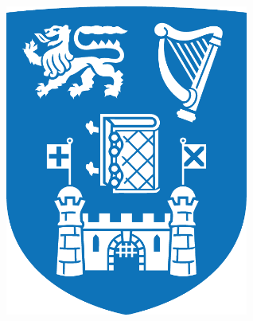 
\begin{titlepage}

\begin{addmargin}[1cm]{-1cm}
\begin{center}
\large

\hfill
\vfill

\begingroup
\color{black}\spacedallcaps{\textbf{\myTitle}} \\ \bigskip %
\endgroup



\vfill
\medskip

\includegraphics[width=8cm]{Images/trinity_newb.pdf} \\ \medskip %


\medskip
\medskip
\medskip
{\myProf}\\%
\medskip
\medskip
\small{}\\
\small{}\\
\medskip
\medskip
\small\spacedallcaps{ \myFaculty }\\
\small\spacedallcaps{ \myUni     }\\
\medskip
\medskip
\small{}


\vfill

\end{center}
\end{addmargin}

\end{titlepage}
